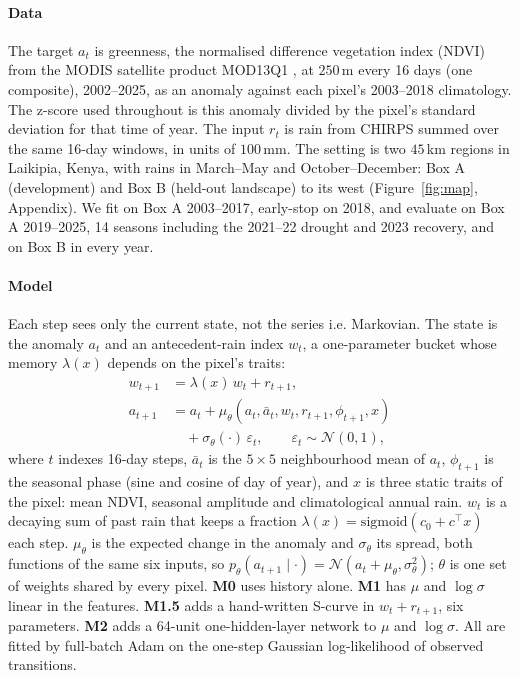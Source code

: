 \documentclass[letterpaper]{article} %
\begin{document}
\paragraph{Data} The target $a_t$ is greenness, the normalised difference vegetation index (NDVI) from the MODIS satellite product MOD13Q1 \citep{mod13}, at $250$\,m every 16 days (one composite), 2002--2025, as an anomaly against each pixel's 2003--2018 climatology. The z-score used throughout is this anomaly divided by the pixel's standard deviation for that time of year. The input $r_t$ is rain from CHIRPS \citep{chirps} summed over the same 16-day windows, in units of $100$\,mm. The setting is two $45$\,km regions in Laikipia, Kenya, with rains in March--May and October--December: Box A (development) and Box B (held-out landscape) to its west (Figure~\ref{fig:map}, Appendix). We fit on Box A 2003--2017, early-stop on 2018, and evaluate on Box A 2019--2025, 14 seasons including the 2021--22 drought and 2023 recovery, and on Box B in every year.

\paragraph{Model} Each step sees only the current state, not the series i.e. Markovian. The state is the anomaly $a_t$ and an antecedent-rain index $w_t$, a one-parameter bucket whose memory $\lambda(x)$ depends on the pixel's traits:
\begin{align}
w_{t+1} &= \lambda(x)\,w_t + r_{t+1}, \nonumber\\
a_{t+1} &= a_t + \mu_\theta(a_t, \bar a_t, w_t, r_{t+1}, \phi_{t+1}, x) \nonumber\\
&\quad + \sigma_\theta(\cdot)\,\varepsilon_t,\qquad \varepsilon_t\sim\mathcal N(0,1),
\label{eq:model}
\end{align}
where $t$ indexes 16-day steps, $\bar a_t$ is the $5\times5$ neighbourhood mean of $a_t$, $\phi_{t+1}$ is the seasonal phase (sine and cosine of day of year), and $x$ is three static traits of the pixel: mean NDVI, seasonal amplitude and climatological annual rain. $w_t$ is a decaying sum of past rain that keeps a fraction $\lambda(x)=\mathrm{sigmoid}(c_0+c^\top x)$ each step. $\mu_\theta$ is the expected change in the anomaly and $\sigma_\theta$ its spread, both functions of the same six inputs, so $p_\theta(a_{t+1}\mid\cdot)=\mathcal N(a_t+\mu_\theta,\sigma_\theta^2)$; $\theta$ is one set of weights shared by every pixel. \textbf{M0} uses history alone. \textbf{M1} has $\mu$ and $\log\sigma$ linear in the features. \textbf{M1.5} adds a hand-written S-curve in $w_t+r_{t+1}$, six parameters. \textbf{M2} adds a 64-unit one-hidden-layer network to $\mu$ and $\log\sigma$. All are fitted by full-batch Adam \citep{kingma2015} on the one-step Gaussian log-likelihood of observed transitions.
\end{document}
